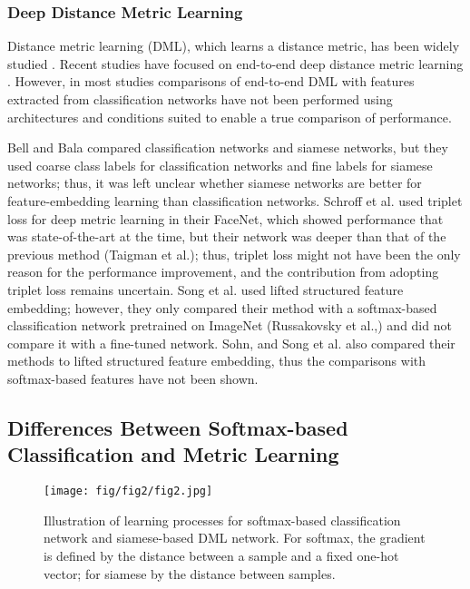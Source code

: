 \documentclass[9pt,technote,compsoc]{./sty/IEEEtran}
\begin{document}
\subsubsection{Deep Distance Metric Learning}
Distance metric learning (DML), which learns a distance metric, has been widely studied 
\cite{bromley1994signature}\cite{chopra2005learning}\cite{chechik2010large}\cite{qian2015fine}.
Recent studies have focused on end-to-end deep distance metric learning \cite{bell2015productnet}\cite{schroff2015facenet}\cite{song2016deep}\cite{sohn2016improved}\cite{song2017learnable}.
However, in most studies comparisons of end-to-end DML with features extracted from classification networks have not been performed using architectures and conditions suited to enable a true comparison of performance.

Bell and Bala\cite{bell2015productnet} compared classification
networks and siamese networks, but they used coarse class labels
for classification networks and fine labels for siamese networks;
thus, it was left unclear whether siamese networks are
better for feature-embedding learning than classification networks.
Schroff et al.\cite{schroff2015facenet} used triplet loss for deep metric
learning in their FaceNet, which showed performance that
was state-of-the-art at the time, but their network was deeper
than that of the previous method (Taigman et al.\cite{taigman2014deepface}); thus,
triplet loss might not have been the only reason for the performance
improvement, and the contribution from adopting triplet
loss remains uncertain. Song et al.\cite{song2016deep} used lifted structured
feature embedding; however, they only compared their
method with a softmax-based classification network pretrained
on ImageNet (Russakovsky et al.,\cite{russakovsky2015imagenet}) and 
did not compare it with a fine-tuned network.  Sohn\cite{sohn2016improved}, 
and Song et al.\cite{song2017learnable}
also compared their methods to lifted
structured feature embedding, thus the comparisons with softmax-based
features have not been shown.

\subsection{Differences Between Softmax-based Classification and Metric Learning}
\begin{figure}[t]
	\centering
	\texttt{[image: fig/fig2/fig2.jpg]}
	\caption{Illustration of learning processes for softmax-based classification network and siamese-based DML network. For softmax, the gradient is defined by the distance between a sample and a fixed one-hot vector; for siamese by the distance between samples.}
	\label{fig:softmaxAndDML}
\end{figure}
\end{document}
